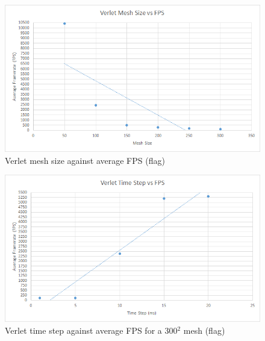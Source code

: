     \begin{figure}
    \begin{center}
      \includegraphics[scale=.9]{Figures/flag_v_m_fps}
    \end{center}
    \caption{Verlet mesh size against average FPS (flag)}
    \label{fig:v mesh fps flag}
  \end{figure}
  
    \begin{figure}
    \begin{center}
      \includegraphics[scale=.9]{Figures/flag_v_ts_fps}
    \end{center}
    \caption{Verlet time step against average FPS for a 300$^{2}$ mesh (flag)}
    \label{fig:v step fps flag}
  \end{figure}
  
